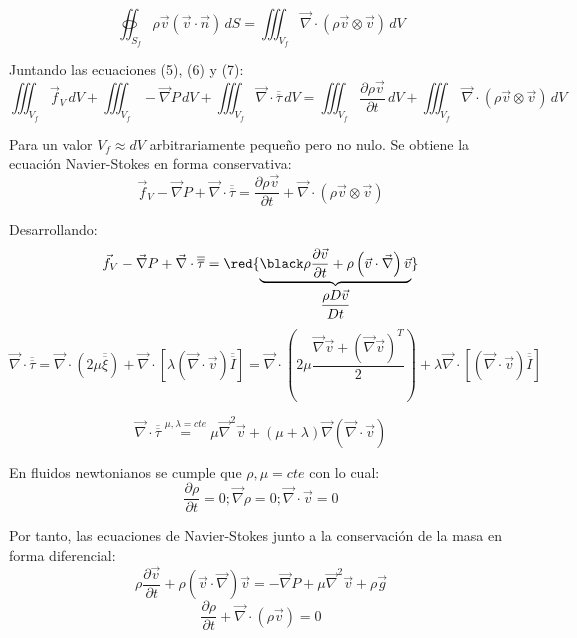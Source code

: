 \begin{equation}
\oiint_{S_f}\rho\vec{v}\left(\vec{v}\cdot\vec{n}\right)\,dS
=
\iiint_{V_f}\vec{\nabla}\cdot\left(\rho \vec{ v} \otimes \vec{v}\right)\,dV
\end{equation}

Juntando las ecuaciones (5), (6) y (7):
\[\iiint_{V_f}\vec{f}_V\,dV
+
\iiint_{V_f}-\vec{\nabla}P\,dV
+
\iiint_{V_f}\vec{\nabla}\cdot\overline{\overline{\tau}}\,dV
=
\iiint_{V_f}\dfrac{\partial \rho\vec{v}}{\partial t}\,dV
+
\iiint_{V_f}\vec{\nabla}\cdot\left(\rho \vec{ v} \otimes \vec{v}\right)\,dV
\]

Para un valor $V_f \approx dV$ arbitrariamente pequeño pero no nulo. Se obtiene la ecuación Navier-Stokes en forma conservativa:
\[
\vec{f}_V
-
\vec{\nabla}P
+
\vec{\nabla}\cdot\overline{\overline{\tau}}
=
\dfrac{\partial \rho\vec{v}}{\partial t}
+
\vec{\nabla}\cdot\left(\rho \vec{ v} \otimes \vec{v}\right)
\]

Desarrollando:
\[\vec{f}_V
-
\vec{\nabla}P
+
\vec{\nabla}\cdot\overline{\overline{\tau}}
=
\red{\underbrace{\black \rho\dfrac{\partial\vec{v}}{\partial t}
+
\rho \left(\vec{v}\cdot\vec{\nabla}\right)\vec{v}}_{\dfrac{\rho D\vec{v}}{Dt}}}\]
\black
\[\vec{\nabla}\cdot\overline{\overline{\tau}}
=
\vec{\nabla}\cdot\left(2\mu\overline{\overline{\xi}}\right)
+
\vec{\nabla}\cdot\left[\lambda\left(\vec{\nabla}\cdot\vec{v}\right)\overline{\overline{I}}\right]
=
\vec{\nabla}\cdot\left(2\mu\dfrac{\vec{\nabla}\vec{v}+\left(\vec{\nabla}\vec{v}\right)^T}{2}\right)
+
\lambda\vec{\nabla}\cdot\left[\left(\vec{\nabla}\cdot\vec{v}\right)\overline{\overline{I}}\right]
\]

\[\vec{\nabla}\cdot\overline{\overline{\tau}}
	\stackrel{\mu,\lambda=cte}{=}
	\mu\vec{\nabla}^2\vec{v}+\left(\mu+\lambda\right)\vec{\nabla}\left(\vec{\nabla}\cdot\vec{v}\right)
	\]
	
En fluidos newtonianos se cumple que $\rho,\mu=cte$ con lo cual:
\[\dfrac{\partial \rho}{\partial t}=0; \vec{\nabla}\rho=0; \vec{\nabla}\cdot\vec{v}=0\]

Por tanto, las ecuaciones de Navier-Stokes junto a la conservación de la masa en forma diferencial:
\[\rho\dfrac{\partial \vec{v}}{\partial t}+\rho\left(\vec{v}\cdot\vec{\nabla}\right)\vec{v}=-\vec{\nabla}P+\mu\vec{\nabla}^2\vec{v}+\rho \vec{g}\]
\[\dfrac{\partial \rho}{\partial t} +\vec{\nabla}\cdot\left(\rho\vec{v}\right)=0\]
